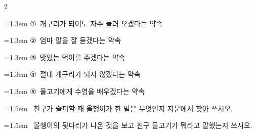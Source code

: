 \documentclass[12pt, a4paper]{article}
\begin{document}
\begin{multicols}{2}
\begin{minipage}{\columnwidth}
\vspace{0.5mm}
{\hangindent=1.3em  \noindent\hspace{0.3em}①~개구리가 되어도 자주 놀러 오겠다는 약속\par}
{\hangindent=1.3em  \noindent\hspace{0.3em}②~엄마 말을 잘 듣겠다는 약속\par}
{\hangindent=1.3em  \noindent\hspace{0.3em}③~맛있는 먹이를 주겠다는 약속\par}
{\hangindent=1.3em  \noindent\hspace{0.3em}④~절대 개구리가 되지 않겠다는 약속\par}
{\hangindent=1.3em  \noindent\hspace{0.3em}⑤~물고기에게 수영을 배우겠다는 약속\par}
\vspace{4mm}
\end{minipage}
\par

\noindent\begin{minipage}{\columnwidth}
\vspace{2mm}
{\hangindent=1.5em  ~친구가 슬퍼할 때 올챙이가 한 말은 무엇인지 지문에서 찾아 쓰시오.\par}

\vspace{3mm}
\noindent\hrulefill
\vspace{2.5mm}
\noindent\hrulefill
\vspace{2.5mm}
\noindent\hrulefill
\vspace{2.5mm}
\noindent\hrulefill
\vspace{2.5mm}
\noindent\hrulefill
\vspace{2.5mm}
\vspace{1mm}
\vspace{4mm}
\end{minipage}
\par

\noindent\begin{minipage}{\columnwidth}
\vspace{2mm}
{\hangindent=1.5em  ~올챙이의 뒷다리가 나온 것을 보고 친구 물고기가 뭐라고 말했는지 쓰시오.\par}

\vspace{3mm}
\noindent\hrulefill
\vspace{2.5mm}
\noindent\hrulefill
\vspace{2.5mm}
\noindent\hrulefill
\vspace{2.5mm}
\noindent\hrulefill
\vspace{2.5mm}
\noindent\hrulefill
\vspace{2.5mm}
\vspace{1mm}
\vspace{4mm}
\end{minipage}
\par



\end{multicols}
\end{document}
